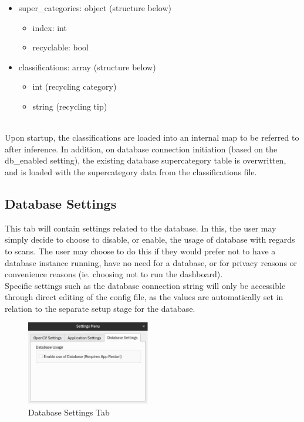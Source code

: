 \documentclass[conference]{IEEEtran}
\begin{document}
\begin{itemize}
\item super\_categories: object (structure below)
\begin{itemize}
\item index: int
\item recyclable: bool
\end{itemize}
\item classifications: array (structure below)
\begin{itemize}
\item int (recycling category)
\item string (recycling tip)
\end{itemize}
\end{itemize}~\\

Upon startup, the classifications are loaded into an internal map to be referred to after inference. In addition, on database connection initiation (based on the db\_enabled setting), the existing database supercategory table is overwritten, and is loaded with the supercategory data from the classifications file.\\

\subsection{Database Settings}
This tab will contain settings related to the database. In this, the user may simply decide to choose to disable, or enable, the usage of database with regards to scans. The user may choose to do this if they would prefer not to have a database instance running, have no need for a database, or for privacy reasons or convenience reasons (ie. choosing not to run the dashboard).~\\

Specific settings such as the database connection string will only be accessible through direct editing of the config file, as the values are automatically set in relation to the separate setup stage for the database.~\\

\begin{figure}[h]
    \centering
    \includegraphics[width=0.48\textwidth]{images/db_settings.eps}
    \caption{Database Settings Tab}
\end{figure}~\\
\end{document}
